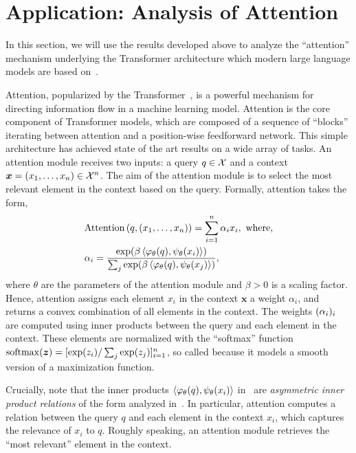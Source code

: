 \section{Application: Analysis of Attention}\label{sec:app_attention}

In this section, we will use the results developed above to analyze the ``attention'' mechanism underlying the Transformer architecture which modern large language models are based on~\parencite[e.g.,][]{chungScalingInstructionFinetunedLanguage2022,openaiGPT4TechnicalReport2023,touvronLlamaOpenFoundation2023,taoriAlpacaStrongReplicable2023}.

Attention, popularized by the Transformer~\parencite{vaswani2017attention}, is a powerful mechanism for directing information flow in a machine learning model. Attention is the core component of Transformer models, which are composed of a sequence of ``blocks'' iterating between attention and a position-wise feedforward network. This simple architecture has achieved state of the art results on a wide array of tasks. An attention module receives two inputs: a query $q \in {\mathcal{X}}$ and a context $\bm{x} = (x_1, \ldots, x_n) \in {\mathcal{X}}^n$. The aim of the attention module is to select the most relevant element in the context based on the query. Formally, attention takes the form,
\begin{equation}\label{eq:def_attention}
    \begin{split}
        &\mathrm{Attention}\paren{q, (x_1, \ldots, x_n)} = \sum_{i=1}^n \alpha_i x_i, \ \text{where,} \\
        &\alpha_i = \frac{\exp(\beta \iprod{\phi_\theta(q)}{\psi_\theta(x_i)})}{\sum_j \exp(\beta \iprod{\phi_\theta(q)}{\psi_\theta(x_j)})},
    \end{split}
\end{equation}
where $\theta$ are the parameters of the attention module and $\beta > 0$ is a scaling factor. Hence, attention assigns each element $x_i$ in the context $\bm{x}$ a weight $\alpha_i$, and returns a convex combination of all elements in the context. The weights $(\alpha_i)_i$ are computed using inner products between the query and each element in the context. These elements are normalized with the ``softmax'' function $\mathrm{softmax}(\bm{z}) = [\exp(z_i) / \sum_j \exp(z_j)]_{i=1}^{n}$, so called because it models a smooth version of a maximization function.

Crucially, note that the inner products $\left \langle \varphi_\theta(q), \psi_\theta(x_i) \right\rangle$ in~ are \textit{asymmetric inner product relations} of the form analyzed in~. In particular, attention computes a relation between the query $q$ and each element in the context $x_i$, which captures the relevance of $x_i$ to $q$. Roughly speaking, an attention module retrieves the ``most relevant'' element in the context.

